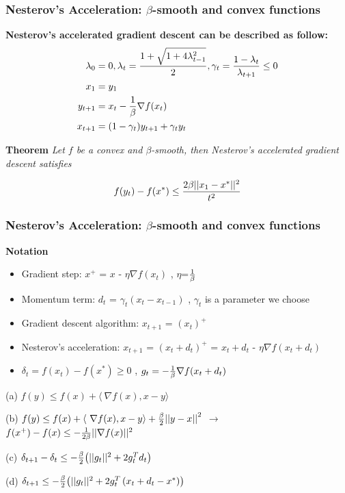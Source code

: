 \begin{frame}\frametitle{ Nesterov’s Acceleration: $\beta$-smooth and convex functions}
\begin{spacing}{0.5}
    

\textbf{Nesterov's accelerated gradient descent can be described as follow:}
\begin{align*}
    \lambda_0 &=0, \lambda_t = {1+\sqrt{1+4 {\lambda^2_{t-1}}} \over 2}, \gamma_t={1-\lambda_t \over \lambda_{t+1}} \leq 0\\
    x_1 &= y_1 \\
    y_{t+1} &= x_t - {1 \over \beta} \nabla{f(x_t)} \\
    x_{t+1} &= {\left(1-\gamma_t \right)}y_{t+1}+{{\gamma_t}}y_{t} \\
\end{align*}

\textbf{Theorem} {\it Let $f$ be a convex and $\beta$-smooth, then Nesterov's accelerated gradient descent satisfies}
\end{spacing}
$$f(y_t)-f(x^*) \leq {2\beta ||x_1-x^*||^2 \over t^2}$$
\end{frame}
    

\begin{frame}\frametitle{ Nesterov’s Acceleration: $\beta$-smooth and convex functions}

\textbf{Notation}

\begin{itemize}
    \item Gradient step: $x^{+}$ = $x$ - ${\eta}$${\nabla}$$f(x_t)$ , ${\eta}$=${1 \over \beta}$
    \item Momentum term: $d_t$ = $\gamma_t{\left(x_t - x_{t-1}\right)}$ , $\gamma_t$ is a parameter we choose
    \item Gradient descent algorithm: $x_{t+1}$ = $(x_t)^+$
    \item Nesterov's acceleration: $x_{t+1}$ = $(x_t + d_t)^+$ = $x_t+d_t$ - $\eta \nabla f(x_t+d_t)$
    \item $\delta_t = f(x_t) - f(x^*) \geq 0$  ,  $g_t = -{1 \over \beta}\nabla f(x_t+d_t)$
\end{itemize}

\begin{lemma}

(a) $f(y) \leq f(x) + \langle\ \nabla f(x), x-y\rangle$ 

(b) $f(y) \leq f(x) + \langle\ \nabla f(x), x-y\rangle + {\beta \over 2}{||y-x||}^2$
$\rightarrow$ $f(x^+) - f(x) \leq - {1\over {2\beta}} ||\nabla f(x)||^2$ 

(c) $\delta_{t+1} - \delta_{t} \leq -{\beta \over 2}{\left(||g_t||^2 + 2g_t^Td_t\right)}$

(d) $\delta_{t+1} \leq -{\beta \over 2}{\left(||g_t||^2 + 2g_t^T\left(x_t+d_t-x^*\right)\right)}$

\end{lemma}

\end{frame}

